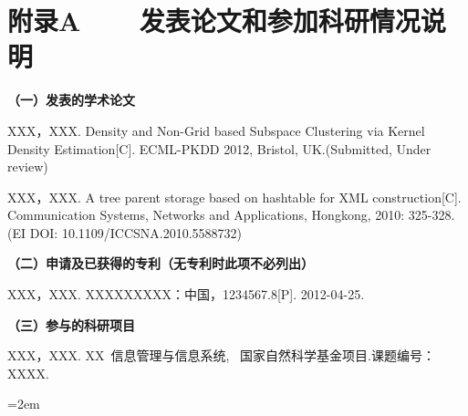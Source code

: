 
\chapter*{附录A~~~~发表论文和参加科研情况说明}
\setlength{\parindent}{0em}
\textbf{（一）发表的学术论文}
\begin{publist}
	\item XXX，XXX. Density and Non-Grid based Subspace Clustering via Kernel Density Estimation[C]. ECML-PKDD 2012, Bristol, UK.(Submitted, Under review)
	\item XXX，XXX. A tree parent storage based on hashtable for XML construction[C]. Communication Systems, Networks and Applications, Hongkong, 2010: 325-328. (EI DOI: 10.1109/ICCSNA.2010.5588732)
\end{publist}

\vspace*{1em}
\textbf{（二）申请及已获得的专利（无专利时此项不必列出）}
\begin{publist}
\item XXX，XXX. XXXXXXXXX：中国，1234567.8[P]. 2012-04-25.
\end{publist}
\vspace*{1em}
\textbf{（三）参与的科研项目}
\begin{publist}
\item	XXX，XXX. XX~信息管理与信息系统, ~国家自然科学基金项目.课题编号：XXXX.
\end{publist}
\vfill
{}\hangindent=2em\noindent

\setlength{\parindent}{2em}
